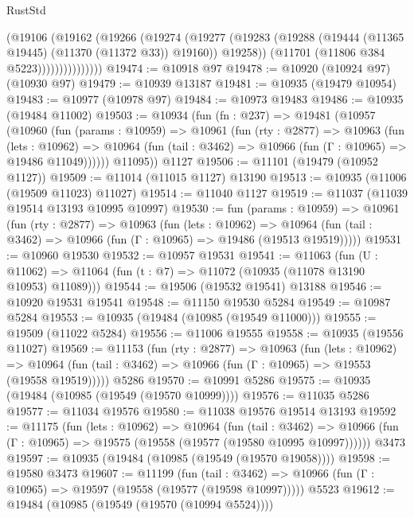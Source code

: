 \begin{lexlean}{RustStd}
\begin{coremodule}
{{{{{{{{{{{{{{{{{{{                      (@19106
                        (@19162
                          (@19266
                            (@19274
                              (@19277
                                (@19283
                                  (@19288 (@19444 (@11365 @19445) (@11370 (@11372 @33)) @19160))
                                  @19258))
                              (@11701 (@11806 @384 @5223)))))))))))))))
@19474 := @10918 @97
@19478 := @10920 (@10924 @97) (@10930 @97)
@19479 := @10939 @13187
@19481 := @10935 (@19479 @10954)
@19483 := @10977 (@10978 @97)
@19484 := @10973 @19483
@19486 := @10935 (@19484 @11002)
@19503 := @10934
    (fun (fn : @237) =>
    @19481
      (@10957
        (@10960
          (fun (params : @10959) =>
          @10961
            (fun (rty : @2877) =>
            @10963
              (fun (lets : @10962) =>
              @10964 (fun (tail : @3462) => @10966 (fun (Γ : @10965) => @19486 @11049))))))
        @11095))
    @1127
@19506 := @11101 (@19479 (@10952 @1127))
@19509 := @11014 (@11015 @1127) @13190
@19513 := @10935 (@11006 (@19509 @11023) @11027)
@19514 := @11040 @1127
@19519 := @11037 (@11039 @19514 @13193 @10995 @10997)
@19530 := fun (params : @10959) =>
  @10961
    (fun (rty : @2877) =>
    @10963
      (fun (lets : @10962) =>
      @10964 (fun (tail : @3462) => @10966 (fun (Γ : @10965) => @19486 (@19513 @19519)))))
@19531 := @10960 @19530
@19532 := @10957 @19531
@19541 := @11063
    (fun (U : @11062) => @11064 (fun (t : @7) => @11072 (@10935 (@11078 @13190 @10953) @11089)))
@19544 := @19506 (@19532 @19541) @13188
@19546 := @10920 @19531 @19541
@19548 := @11150 @19530 @5284
@19549 := @10987 @5284
@19553 := @10935 (@19484 (@10985 (@19549 @11000)))
@19555 := @19509 (@11022 @5284)
@19556 := @11006 @19555
@19558 := @10935 (@19556 @11027)
@19569 := @11153
    (fun (rty : @2877) =>
    @10963
      (fun (lets : @10962) =>
      @10964 (fun (tail : @3462) => @10966 (fun (Γ : @10965) => @19553 (@19558 @19519)))))
    @5286
@19570 := @10991 @5286
@19575 := @10935 (@19484 (@10985 (@19549 (@19570 @10999))))
@19576 := @11035 @5286
@19577 := @11034 @19576
@19580 := @11038 @19576 @19514 @13193
@19592 := @11175
    (fun (lets : @10962) =>
    @10964
      (fun (tail : @3462) =>
      @10966 (fun (Γ : @10965) => @19575 (@19558 (@19577 (@19580 @10995 @10997))))))
    @3473
@19597 := @10935 (@19484 (@10985 (@19549 (@19570 @19058))))
@19598 := @19580 @3473
@19607 := @11199
    (fun (tail : @3462) => @10966 (fun (Γ : @10965) => @19597 (@19558 (@19577 (@19598 @10997)))))
    @5523
@19612 := @19484 (@10985 (@19549 (@19570 (@10994 @5524))))
}}}}}}}}}}}}}}}}}}}
\end{coremodule}
\end{lexlean}
